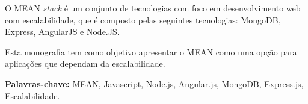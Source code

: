	O MEAN \textit{stack} é um conjunto de tecnologias com foco em desenvolvimento web com escalabilidade, que é composto pelas seguintes tecnologias: MongoDB, Express, AngularJS e Node.JS.

Esta monografia tem como objetivo apresentar o MEAN como uma opção para aplicações que dependam da escalabilidade.
	
\textbf{Palavras-chave:} MEAN, Javascript, Node.js, Angular.js, MongoDB, Express.js, Escalabilidade.